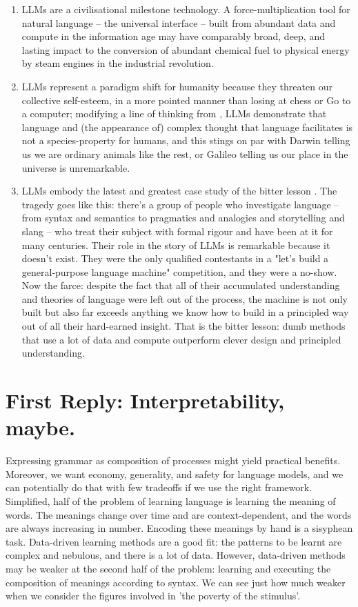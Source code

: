 \begin{enumerate}
\item{
LLMs are a civilisational milestone technology. A force-multiplication tool for natural language -- the universal interface -- built from abundant data and compute in the information age may have comparably broad, deep, and lasting impact to the conversion of abundant chemical fuel to physical energy by steam engines in the industrial revolution.
}
\item{
LLMs represent a paradigm shift for humanity because they threaten our collective self-esteem, in a more pointed manner than losing at chess or Go to a computer; modifying a line of thinking from \citep{floridi_fourth_2014}, LLMs demonstrate that language and (the appearance of) complex thought that language facilitates is not a species-property for humans, and this stings on par with Darwin telling us we are ordinary animals like the rest, or Galileo telling us our place in the universe is unremarkable.
}
\item{
LLMs embody the latest and greatest case study of the bitter lesson \citep{sutton_bitter_2019}. The tragedy goes like this: there's a group of people who investigate language -- from syntax and semantics to pragmatics and analogies and storytelling and slang -- who treat their subject with formal rigour and have been at it for many centuries. Their role in the story of LLMs is remarkable because it doesn't exist. They were the only qualified contestants in a "let's build a general-purpose language machine" competition, and they were a no-show. Now the farce: despite the fact that all of their accumulated understanding and theories of language were left out of the process, the machine is not only built but also far exceeds anything we know how to build in a principled way out of all their hard-earned insight. That is the bitter lesson: dumb methods that use a lot of data and compute outperform clever design and principled understanding.
}
\end{enumerate}

\section{\textbf{First Reply:} Interpretability, maybe.}

Expressing grammar as composition of processes might yield practical benefits. Moreover, we want economy, generality, and safety for language models, and we can potentially do that with few tradeoffs if we use the right framework. Simplified, half of the problem of learning language is learning the meaning of words. The meanings change over time and are context-dependent, and the words are always increasing in number. Encoding these meanings by hand is a sisyphean task. Data-driven learning methods are a good fit: the patterns to be learnt are complex and nebulous, and there is a lot of data. However, data-driven methods may be weaker at the second half of the problem: learning and executing the composition of meanings according to syntax. We can see just how much weaker when we consider the figures involved in 'the poverty of the stimulus'.


